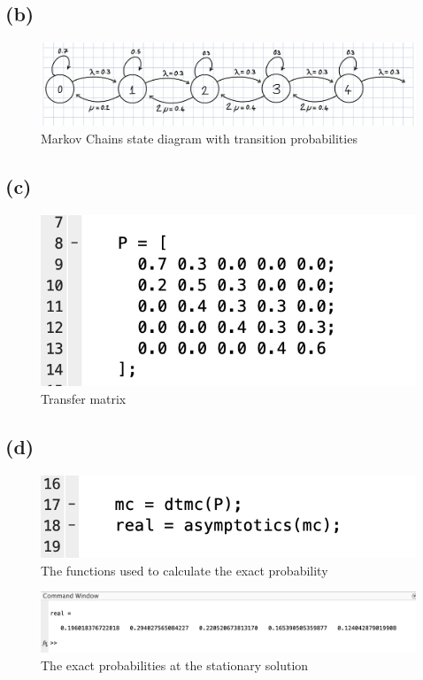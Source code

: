\documentclass{article}
\begin{document}
\subsection{(b)}
\begin{figure}[H]
    \includegraphics[width=\linewidth]{./imgs/5b.JPG}
    \caption{Markov Chains state diagram with transition probabilities}
\end{figure}

\subsection{(c)}
\begin{figure}[H]
    \includegraphics[width=\linewidth]{./imgs/5c.png}
    \caption{Transfer matrix}
\end{figure}

\subsection{(d)}
\begin{figure}[H]
    \includegraphics[width=\linewidth]{./imgs/5dcode.png}
    \caption{The functions used to calculate the exact probability}
\end{figure}
\begin{figure}[H]
    \includegraphics[width=\linewidth]{./imgs/5dans.png}
    \caption{The exact probabilities at the stationary solution}
\end{figure}
\end{document}

